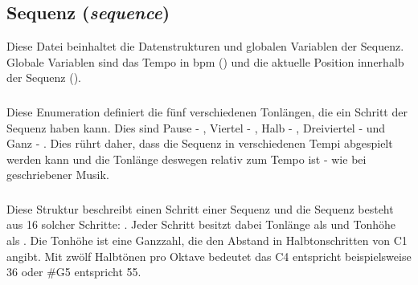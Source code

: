 \subsection{Sequenz (\emph{sequence})}
Diese Datei beinhaltet die Datenstrukturen und globalen Variablen der Sequenz. Globale Variablen sind das Tempo in bpm () und die aktuelle Position innerhalb der Sequenz ().

\subsubsection{}
Diese Enumeration definiert die fünf verschiedenen Tonlängen, die ein Schritt der Sequenz haben kann. Dies sind Pause - , Viertel - , Halb - , Dreiviertel -  und Ganz - . Dies rührt daher, dass die Sequenz in verschiedenen Tempi abgespielt werden kann und die Tonlänge deswegen relativ zum Tempo ist - wie bei geschriebener Musik.

\subsubsection{}
Diese Struktur beschreibt einen Schritt einer Sequenz und die Sequenz besteht aus 16 solcher Schritte: . Jeder Schritt besitzt dabei Tonlänge als  und Tonhöhe als . Die Tonhöhe ist eine Ganzzahl, die den Abstand in Halbtonschritten von C1 angibt. Mit zwölf Halbtönen pro Oktave bedeutet das C4 entspricht beispielsweise 36 oder \#G5 entspricht 55.
